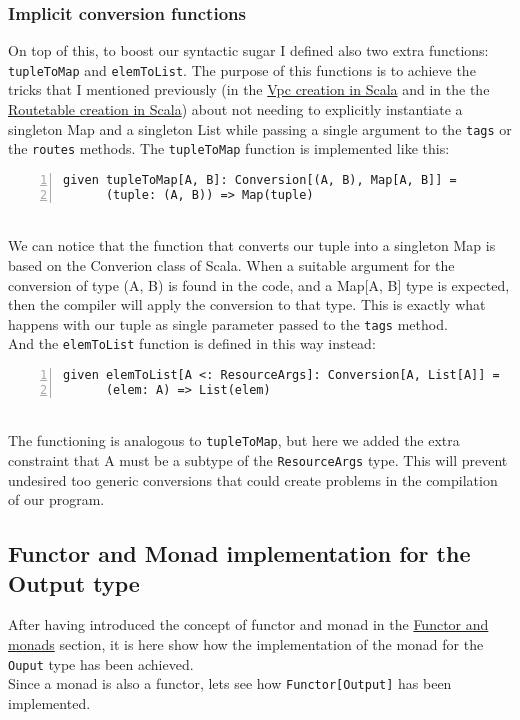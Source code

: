 \subsubsection{Implicit conversion functions}
On top of this, to boost our syntactic sugar I defined also two extra functions: \texttt{tupleToMap} and \texttt{elemToList}.
The purpose of this functions is to achieve the tricks that I mentioned previously (in the \hyperref[sssec:vpc-creation-scala]{Vpc creation in Scala} and in the the \hyperref[sssec:routetable-creation-scala]{Routetable creation in Scala}) about not needing to explicitly instantiate a singleton Map and a singleton List while passing a single argument to the \texttt{tags} or the \texttt{routes} methods.
The \texttt{tupleToMap} function is implemented like this:
\begin{lstlisting}[numbers=left, numberstyle=\tiny, numbersep=-5pt, stepnumber=1, linewidth=420pt]
  given tupleToMap[A, B]: Conversion[(A, B), Map[A, B]] =
	  (tuple: (A, B)) => Map(tuple)
\end{lstlisting}\mbox{}\\
We can notice that the function that converts our tuple into a singleton Map is based on the Converion class of Scala.
When a suitable argument for the conversion of type (A, B) is found in the code, and a Map[A, B] type is expected, then the compiler will apply the conversion to that type.
This is exactly what happens with our tuple as single parameter passed to the \texttt{tags} method.\\
And the \texttt{elemToList} function is defined in this way instead:
\begin{lstlisting}[numbers=left, numberstyle=\tiny, numbersep=-5pt, stepnumber=1, linewidth=420pt]
  given elemToList[A <: ResourceArgs]: Conversion[A, List[A]] =
	  (elem: A) => List(elem)
\end{lstlisting}\mbox{}\\
The functioning is analogous to \texttt{tupleToMap}, but here we added the extra constraint that A must be a subtype of the \texttt{ResourceArgs} type.
This will prevent undesired too generic conversions that could create problems in the compilation of our program.

\subsection{Functor and Monad implementation for the Output type}
After having introduced the concept of functor and monad in the \hyperref[sssec:functors-monads]{Functor and monads} section, it is here show how the implementation of the monad for the \texttt{Ouput} type has been achieved.\\
Since a monad is also a functor, lets see how \texttt{Functor[Output]} has been implemented.


